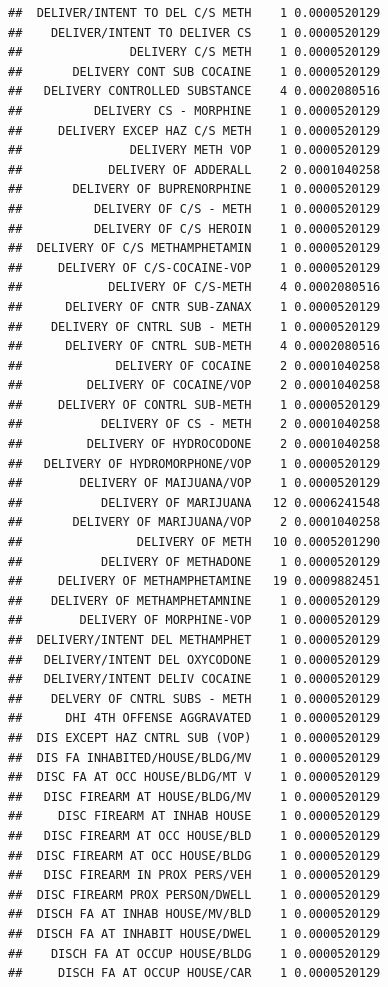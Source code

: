 \documentclass[]{book}
\begin{document}
\begin{verbatim}
##  DELIVER/INTENT TO DEL C/S METH    1 0.0000520129
##    DELIVER/INTENT TO DELIVER CS    1 0.0000520129
##               DELIVERY C/S METH    1 0.0000520129
##       DELIVERY CONT SUB COCAINE    1 0.0000520129
##   DELIVERY CONTROLLED SUBSTANCE    4 0.0002080516
##          DELIVERY CS - MORPHINE    1 0.0000520129
##     DELIVERY EXCEP HAZ C/S METH    1 0.0000520129
##               DELIVERY METH VOP    1 0.0000520129
##            DELIVERY OF ADDERALL    2 0.0001040258
##       DELIVERY OF BUPRENORPHINE    1 0.0000520129
##          DELIVERY OF C/S - METH    1 0.0000520129
##          DELIVERY OF C/S HEROIN    1 0.0000520129
##  DELIVERY OF C/S METHAMPHETAMIN    1 0.0000520129
##     DELIVERY OF C/S-COCAINE-VOP    1 0.0000520129
##            DELIVERY OF C/S-METH    4 0.0002080516
##      DELIVERY OF CNTR SUB-ZANAX    1 0.0000520129
##    DELIVERY OF CNTRL SUB - METH    1 0.0000520129
##      DELIVERY OF CNTRL SUB-METH    4 0.0002080516
##             DELIVERY OF COCAINE    2 0.0001040258
##         DELIVERY OF COCAINE/VOP    2 0.0001040258
##     DELIVERY OF CONTRL SUB-METH    1 0.0000520129
##           DELIVERY OF CS - METH    2 0.0001040258
##         DELIVERY OF HYDROCODONE    2 0.0001040258
##   DELIVERY OF HYDROMORPHONE/VOP    1 0.0000520129
##        DELIVERY OF MAIJUANA/VOP    1 0.0000520129
##           DELIVERY OF MARIJUANA   12 0.0006241548
##       DELIVERY OF MARIJUANA/VOP    2 0.0001040258
##                DELIVERY OF METH   10 0.0005201290
##           DELIVERY OF METHADONE    1 0.0000520129
##     DELIVERY OF METHAMPHETAMINE   19 0.0009882451
##    DELIVERY OF METHAMPHETAMNINE    1 0.0000520129
##        DELIVERY OF MORPHINE-VOP    1 0.0000520129
##  DELIVERY/INTENT DEL METHAMPHET    1 0.0000520129
##   DELIVERY/INTENT DEL OXYCODONE    1 0.0000520129
##   DELIVERY/INTENT DELIV COCAINE    1 0.0000520129
##    DELVERY OF CNTRL SUBS - METH    1 0.0000520129
##      DHI 4TH OFFENSE AGGRAVATED    1 0.0000520129
##  DIS EXCEPT HAZ CNTRL SUB (VOP)    1 0.0000520129
##  DIS FA INHABITED/HOUSE/BLDG/MV    1 0.0000520129
##  DISC FA AT OCC HOUSE/BLDG/MT V    1 0.0000520129
##   DISC FIREARM AT HOUSE/BLDG/MV    1 0.0000520129
##     DISC FIREARM AT INHAB HOUSE    1 0.0000520129
##   DISC FIREARM AT OCC HOUSE/BLD    1 0.0000520129
##  DISC FIREARM AT OCC HOUSE/BLDG    1 0.0000520129
##   DISC FIREARM IN PROX PERS/VEH    1 0.0000520129
##  DISC FIREARM PROX PERSON/DWELL    1 0.0000520129
##  DISCH FA AT INHAB HOUSE/MV/BLD    1 0.0000520129
##  DISCH FA AT INHABIT HOUSE/DWEL    1 0.0000520129
##    DISCH FA AT OCCUP HOUSE/BLDG    1 0.0000520129
##     DISCH FA AT OCCUP HOUSE/CAR    1 0.0000520129

\end{verbatim}
\end{document}
